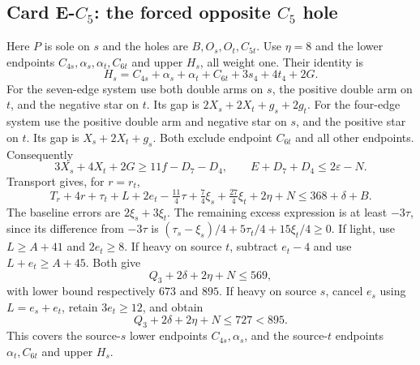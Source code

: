 \documentclass[11pt,letterpaper]{article}
\theoremstyle{definition}\newtheorem{definition}[theorem]{Definition}
\begin{document}
\subsection{Card E-$C_5$: the forced opposite $C_5$ hole}\label{sec:z4-cardEC}
Here $P$ is sole on $s$ and the holes are $B,O_s,O_t,C_{5t}$. Use $\eta=8$ and the lower endpoints $C_{4s},\alpha_s,\alpha_t,C_{6t}$ and upper $H_s$, all weight one. Their identity is
\[
 H_s=C_{4s}+\alpha_s+\alpha_t+C_{6t}+3s_4+4t_4+2G.
\]
For the seven-edge system use both double arms on $s$, the positive double arm on $t$, and the negative star on $t$. Its gap is $2X_s+2X_t+g_s+2g_t$. For the four-edge system use the positive double arm and negative star on $s$, and the positive star on $t$. Its gap is $X_s+2X_t+g_s$. Both exclude endpoint $C_{6t}$ and all other endpoints. Consequently
\[
 3X_s+4X_t+2G\ge11f-D_7-D_4,
 \qquad E+D_7+D_4\le2\varepsilon-N.
\]
Transport gives, for $r=r_t$,
\[
 T_r+4r+\tau_t+L+2e_t-\tfrac{11}4\tau
 +\tfrac74\xi_s+\tfrac{27}4\xi_t+2\eta+N
 \le368+\delta+B.
\]
The baseline errors are $2\xi_s+3\xi_t$. The remaining excess expression is at least $-3\tau$, since its difference from $-3\tau$ is
$(\tau_s-\xi_s)/4+5\tau_t/4+15\xi_t/4\ge0$.
If light, use $L\ge A+41$ and $2e_t\ge8$. If heavy on source $t$, subtract $e_t-4$ and use $L+e_t\ge A+45$. Both give
\[
 Q_3+2\delta+2\eta+N\le569,
\]
with lower bound respectively $673$ and $895$. If heavy on source $s$, cancel $e_s$ using $L=e_s+e_t$, retain $3e_t\ge12$, and obtain
\[
 Q_3+2\delta+2\eta+N\le727<895.
\]
This covers the source-$s$ lower endpoints $C_{4s},\alpha_s$, and the source-$t$ endpoints $\alpha_t,C_{6t}$ and upper $H_s$.
\end{document}
